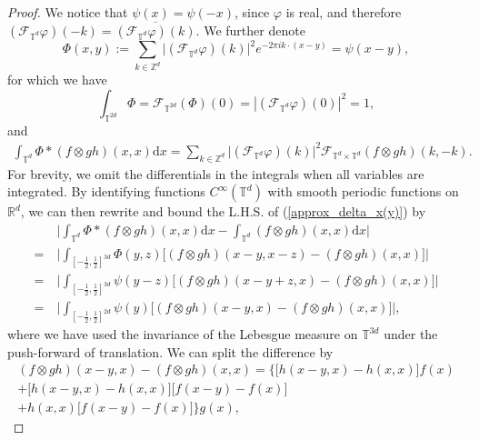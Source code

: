 \begin{proof}We notice that $\psi(x) = \psi(-x)$, since $\varphi$ is real, and therefore $(\mathscr{F}_{\mathbb{T}^d}\varphi) (-k) = \overline{(\mathscr{F}_{\mathbb{T}^d}\varphi) (k)}$. We further denote 
\begin{equation}
\Phi(x,y) := \sum_{k \in \mathbb{Z}^d}\big| (\mathscr{F}_{\mathbb{T}^d}\varphi) (k)\big|^2 e^{-2\pi i k\cdot(x-y)} = \psi(x-y),
\end{equation}
for which we have 
\[
\int_{\mathbb{T}^{2d}}\Phi = \mathscr{F}_{\mathbb{T}^{2d}}(\Phi)(0) = |(\mathscr{F}_{\mathbb{T}^{d}}\varphi)(0)|^2 = 1,
\]
and 
\begin{align*}
\int_{\mathbb{T}^{d}}\Phi \ast (f\otimes gh)(x,x)\mathrm{d}x = \sum_{k \in \mathbb{Z}^d}  \big|(\mathscr{F}_{\mathbb{T}^d}\varphi) (k)\big|^2 \mathscr{F}_{\mathbb{T}^d \times \mathbb{T}^d}(f \otimes g h)(k,-k).
\end{align*}
For brevity, we omit the differentials in the integrals when all variables are integrated. By identifying functions $C^{\infty}(\mathbb{T}^d)$ with smooth periodic functions on $\mathbb{R}^d$, we can then rewrite and bound the L.H.S. of (\ref{approx_delta_x(y)}) by 
\begin{align*}
& \ \big| \int_{\mathbb{T}^{d}}\Phi \ast (f\otimes gh)(x,x)\mathrm{d}x -   \int_{\mathbb{T}^{d}} (f\otimes gh)(x,x)\mathrm{d}x\big|\\
= & \ \big| \int_{[-\frac{1}{2}, \frac{1}{2}]^{3d}} \Phi(y,z) \big[(f\otimes gh)(x-y, x - z) -  (f\otimes gh)(x,x)\big]\big|\\
= & \ \big| \int_{[-\frac{1}{2}, \frac{1}{2}]^{3d}}  \psi(y - z) \big[(f\otimes gh)(x - y +z , x) -  (f\otimes gh)(x,x)\big]\big|\\
= & \ \big| \int_{[-\frac{1}{2}, \frac{1}{2}]^{2d}}  \psi(y) \big[(f\otimes gh)(x - y, x) -  (f\otimes gh)(x,x)\big]\big|,
\end{align*}
where we have used the invariance of the Lebesgue measure on $\mathbb{T}^{3d}$ under the push-forward of translation. We can split the difference by
\begin{equation}\label{eq:split_fgh}
\begin{split}
(f\otimes gh)(x - y, x) -  (f\otimes gh)(x,x) = \big\{\big[h(x - y, x) - h(x,x)\big]f(x)\\
 + \big[h(x - y, x) - h(x,x)\big]\big[f(x - y) - f(x)\big]\\ + h(x,x)\big[f(x - y) - f(x)\big]\big\}g(x),
 \end{split}
\end{equation}

\end{proof}
